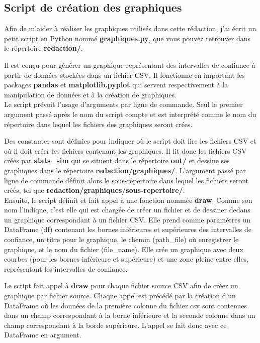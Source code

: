\documentclass[12pt,french,titlepage]{article}
\begin{document}
\newpage

\subsection{Script de création des graphiques}
\label{sec:script_graph}
Afin de m'aider à réaliser les graphiques utilisés dans cette rédaction, j'ai écrit un petit script en Python nommé \textbf{graphiques.py}, que vous pouvez retrouver dans le répertoire \textbf{redaction/}. 

Il est conçu pour générer un graphique représentant des intervalles de confiance à partir de données stockées dans un fichier CSV. Il fonctionne en important les packages \textbf{pandas} et \textbf{matplotlib.pyplot} qui servent respectivement à la manipulation de données et à la création de graphiques.\\

Le script prévoit l'usage d'arguments par ligne de commande. Seul le premier argument passé après le nom du script compte et est interprété comme le nom du répertoire dans lequel les fichiers des graphiques seront crées.

Des constantes sont définies pour indiquer où le script doit lire les fichiers CSV et où il doit créer les fichiers contenant les graphiques. Il lit donc les fichiers CSV crées par \textbf{stats\_sim} qui se situent dans le répertoire \textbf{out/} et dessine ses graphiques dans le répertoire \textbf{redaction/graphiques/}. L'argument passé par ligne de commande définit alors le sous-répertoire dans lequel les fichiers seront créés, tel que \textbf{redaction/graphiques/sous-repertoire/}.\\

Ensuite, le script définit et fait appel à une fonction nommée \textbf{draw}. Comme son nom l'indique, c'est elle qui est chargée de créer un fichier et de dessiner dedans un graphique correspondant à un fichier CSV. Elle prend comme paramètres un DataFrame (df) contenant les bornes inférieures et supérieures des intervalles de confiance, un titre pour le graphique, le chemin (path\_file) où enregistrer le graphique, et le nom du fichier (file\_name). Elle crée un graphique avec deux courbes (pour les bornes inférieure et supérieure) et une zone pleine entre elles, représentant les intervalles de confiance.

Le script fait appel à \textbf{draw} pour chaque fichier source CSV afin de créer un graphique par fichier source. Chaque appel est précédé par la création d'un DataFrame où les données de la première colonne du fichier csv sont contenues dans un champ correspondant à la borne inférieure et la seconde colonne dans un champ correspondant à la borde supérieure. L'appel se fait donc avec ce DataFrame en argument.
\end{document}
